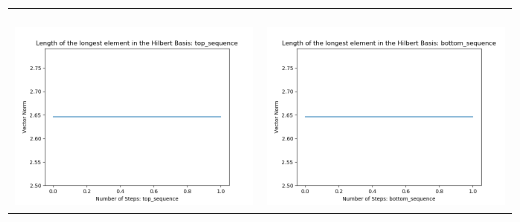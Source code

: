 \documentclass[10pt]{article}
\begin{document}
\begin{tabular}{c|c}
\begin{minipage}{.45\textwidth}
\end{minipage} \\ \\
\hline \\\begin{minipage}{.45\textwidth}
\includegraphics[width=\textwidth]{"DATA/5d/6 generators 1 bound B/top_sequence LENGTH"}
\end{minipage} &
\begin{minipage}{.45\textwidth}
\includegraphics[width=\textwidth]{"DATA/5d/6 generators 1 bound B bottomup/bottom_sequence LENGTH"}
\end{minipage}
\end{tabular}
\end{document}
